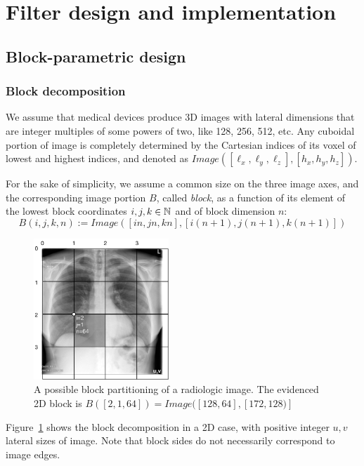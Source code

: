 \section{Filter design and implementation}\label{sec:filter}



\subsection{Block-parametric design}\label{sec:block}

\subsubsection{Block decomposition}\label{sec:bbbb}

We assume that medical devices produce 3D images with lateral dimensions that are integer multiples of some powers of two, like 128, 256, 512, etc.
Any cuboidal portion of image is completely determined by the Cartesian indices of its voxel of lowest and highest indices, and denoted as $Image([\ell_x, \ell_y, \ell_z],[h_x, h_y, h_z])$.

For the sake of simplicity, we assume a common size on the three image axes, and the corresponding image portion $B$, called \emph{block}, as a function of its element of the  lowest  block  coordinates $i,j,k\in\mathbb{N}$ and of block dimension $n$:
\[
B(i,j,k,n) := Image([in,jn,kn],[i(n+1),j(n+1),k(n+1)]) 
\]

\begin{figure}[htbp] %
   \centering
   \includegraphics[width=2in]{figs/blocks} 
   \caption{A possible block partitioning of a radiologic image. The evidenced 2D block is $B([2,1,64]) = Image([128,64],[172,128)]$}
   \label{fig:blocks}
\end{figure}


Figure~\ref{fig:blocks} shows the block decomposition in a 2D case, with positive integer $u,v$ lateral sizes of image. Note that block sides do not necessarily correspond to image edges. 


